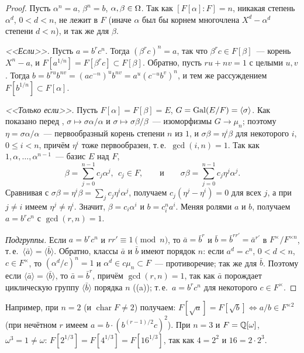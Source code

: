 \begin{proof}
Пусть $\alpha^n=a$, $\beta^n=b$, $\alpha,\beta\in\Omega$. Так как $[F[\alpha]:F]=n$, никакая степень $\alpha^d$, $0<d<n$,
не лежит в $F$ (иначе $\alpha$ был бы корнем многочлена $X^d-\alpha^d$ степени $d<n$), и так же для $\beta$.

\emph{<<Если>>.} Пусть $a=b^rc^n$. Тогда $(\beta^rc)^n=a$, так что $\beta^rc\in F[\beta]$~--- корень $X^n-a$, и
$F[a^{1/n}]=F[\beta^rc]\subset F[\beta]$. Обратно, пусть $ru+nv=1$ с целыми $u,v$. Тогда
$b=b^{ru}b^{nv}=(ac^{-n})^ub^{nv}=a^u(c^{-u}b^v)^n$, и тем же рассуждением $F[b^{1/n}]\subset F[\alpha]$.

\emph{<<Только если>>.} Пусть $F[\alpha]=F[\beta]=E$, $G=\operatorname{Gal}(E/F)=\langle\sigma\rangle$. Как показано перед ,
$\sigma\mapsto\sigma\alpha/\alpha$ и $\sigma\mapsto\sigma\beta/\beta$~--- изоморфизмы $G\to\mu_n$; поэтому
$\eta=\sigma\alpha/\alpha$~--- первообразный корень степени $n$ из $1$, и $\sigma\beta=\eta^i\beta$ для некоторого $i$,
$0\le i<n$, причём $\eta^i$ тоже первообразен, т.\,е.\ $\gcd(i,n)=1$. Так как $1,\alpha,\dots,\alpha^{n-1}$~--- базис $E$ над
$F$,
\[
\beta=\sum_{j=0}^{n-1}c_j\alpha^j,\ \ c_j\in F,\qquad\text{и}\qquad \sigma\beta=\sum_{j=0}^{n-1}c_j\eta^j\alpha^j.
\]
Сравнивая с $\sigma\beta=\eta^i\beta=\sum_jc_j\eta^i\alpha^j$, получаем $c_j(\eta^j-\eta^i)=0$ для всех $j$, а при $j\ne i$
имеем $\eta^j\ne\eta^i$. Значит, $\beta=c_i\alpha^i$ и $b=c_i^na^i$. Меняя ролями $a$ и $b$, получаем $a=b^rc^n$ с
$\gcd(r,n)=1$.

\emph{Подгруппы.} Если $a=b^rc^n$ и $rr'\equiv1\pmod n$, то $\bar a=\bar b^r$ и $\bar b=\bar b^{rr'}=\bar a^{r'}$ в
$F^\times/F^{\times n}$, т.\,е.\ $\langle\bar a\rangle=\langle\bar b\rangle$. Обратно, классы $\bar a$ и $\bar b$ имеют
порядок $n$: если $a^d=c^n$, $0<d<n$, $c\in F^\times$, то $(\alpha^d/c)^n=1$ и $\alpha^d\in c\mu_n\subset F$~---
противоречие; так же для $\bar b$. Поэтому если $\langle\bar a\rangle=\langle\bar b\rangle$, то $\bar a=\bar b^r$, причём
$\gcd(r,n)=1$, так как $\bar a$ порождает циклическую группу $\langle\bar b\rangle$ порядка $n$ ((a)); т.\,е.\
$a=b^rc^n$ для некоторого $c\in F^\times$.
\end{proof}

Например, при $n=2$ (и $\operatorname{char}F\ne2$) получаем: $F[\sqrt a]=F[\sqrt b]\iff a/b\in F^{\times2}$ (при нечётном $r$
имеем $a=b\cdot(b^{(r-1)/2}c)^2$). При $n=3$ и $F=\mathbb Q[\omega]$, $\omega^3=1\ne\omega$: $F[2^{1/3}]=F[4^{1/3}]=F[16^{1/3}]$, так
как $4=2^2$ и $16=2\cdot2^3$.

